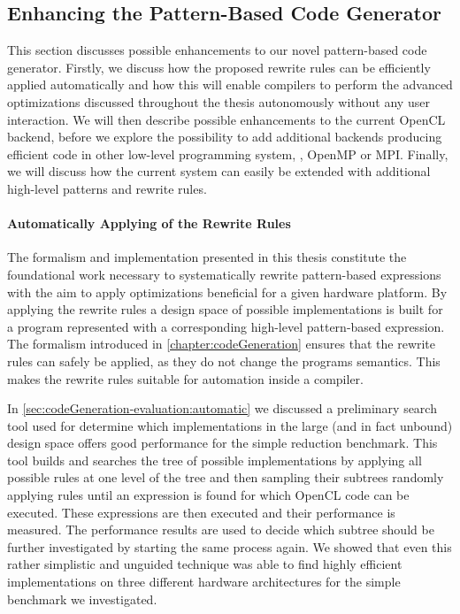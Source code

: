 \subsection{Enhancing the Pattern-Based Code Generator}
\label{section:future-work:codeGenerator}

This section discusses possible enhancements to our novel pattern-based code generator.
Firstly, we discuss how the proposed rewrite rules can be efficiently applied automatically and how this will enable compilers to perform the advanced optimizations discussed throughout the thesis autonomously without any user interaction.
We will then describe possible enhancements to the current OpenCL backend, before we explore the possibility to add additional backends producing efficient code in other low-level programming system, \eg, OpenMP or MPI.
Finally, we will discuss how the current system can easily be extended with additional high-level patterns and rewrite rules.

\paragraph{Automatically Applying of the Rewrite Rules}
The formalism and implementation presented in this thesis constitute the foundational work necessary to systematically rewrite pattern-based expressions with the aim to apply optimizations beneficial for a given hardware platform.
By applying the rewrite rules a design space of possible implementations is built for a program represented with a corresponding high-level pattern-based expression.
The formalism introduced in \autoref{chapter:codeGeneration} ensures that the rewrite rules can safely be applied, as they do not change the programs semantics.
This makes the rewrite rules suitable for automation inside a compiler.

In \autoref{sec:codeGeneration-evaluation:automatic} we discussed a preliminary search tool used for determine which implementations in the large (and in fact unbound) design space offers good performance for the simple reduction benchmark.
This tool builds and searches the tree of possible implementations by applying all possible rules at one level of the tree and then sampling their subtrees randomly applying rules until an expression is found for which OpenCL code can be executed.
These expressions are then executed and their performance is measured.
The performance results are used to decide which subtree should be further investigated by starting the same process again.
We showed that even this rather simplistic and unguided technique was able to find highly efficient implementations on three different hardware architectures for the simple benchmark we investigated.

